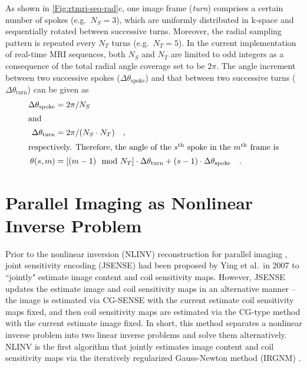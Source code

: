 As shown in \cref{Fig:rtmri-seq-rad}c, one image frame (\textit{turn}) comprises a certain number of spokes (e.g.~$N_S = 3$), which are uniformly distributed in k-space and sequentially rotated between successive turns. Moreover, the radial sampling pattern is repeated every $N_T$ turns (e.g.~$N_T = 5$). In the current implementation of real-time MRI sequences, both $N_S$ and $N_T$ are limited to odd integers as a consequence of the total radial angle coverage set to be $2\pi$. The angle increment between two successive spokes ($\Delta \theta_{\text{spoke}}$) and that between two successive turns ($\Delta \theta_{\text{turn}}$) can be given as 
\begin{align}
  \Delta \theta_{\text{spoke}} &= 2\pi / N_S \\
\intertext{and}
  \Delta \theta_{\text{turn}}  &= 2\pi / (N_S \cdot N_T) \quad ,\\
\intertext{respectively. Therefore, the angle of the $s^{\text{th}}$ spoke in the $m^{\text{th}}$ frame is}
  \theta (s, m) &= [ (m-1) \mod{N_T} ] \cdot \Delta \theta_{\text{turn}} + (s-1) \cdot \Delta \theta_{\text{spoke}} \quad . \label{Equ:rtmri-spk-ang}
\end{align}

\section{Parallel Imaging as Nonlinear Inverse Problem} \label{Sec:rtmri-nlinv}
Prior to the nonlinear inversion (\acs{NLINV}) reconstruction for parallel imaging \cite{2007_IRGNM_PI,2008_NLINV,2010_NLINV_Heart,2010_20ms_Uecker}, joint sensitivity encoding (\acs{JSENSE}) \cite{2007_JSENSE} had been proposed by Ying et al.~in 2007 to ``jointly" estimate image content and coil sensitivity maps. However, JSENSE updates the estimate image and coil sensitivity maps in an alternative manner -- the image is estimated via CG-SENSE with the current estimate coil sensitivity maps fixed, and then coil sensitivity maps are estimated via the CG-type method with the current estimate image fixed. In short, this method separates a nonlinear inverse problem into two linear inverse problems and solve them alternatively. NLINV is the first algorithm that jointly estimates image content and coil sensitivity maps via the iteratively regularized Gauss-Newton method (\acs{IRGNM}) \cite{1996_regu_inv,2004_iter_inv}. 

